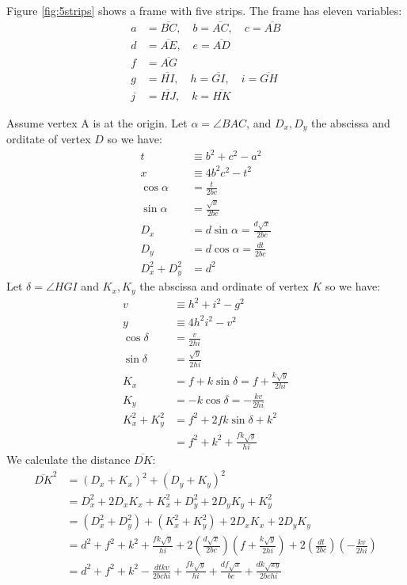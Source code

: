 \documentclass[11pt]{article}
\begin{document}
Figure \ref{fig:5strips} shows a frame with five strips. The frame has eleven variables:
\begin{align}
a &= \overline{BC}, \quad b = \overline{AC}, \quad c = \overline{AB}\\
d &= \overline{AE}, \quad e = \overline{AD}\\
f &= \overline{AG}\\
g &= \overline{HI}, \quad h = \overline{GI}, \quad i = \overline{GH}\\
j &= \overline{HJ}, \quad k = \overline{HK}
\end{align}

Assume vertex A is at the origin.
Let $\alpha = \angle{BAC}$, and $D_x,D_y$ the abscissa and orditate of vertex $D$ so we have:
\begin{align}
t &\equiv b^2 + c^2 - a^2\\
x &\equiv 4b^2c^2 - t^2\\
\cos\alpha &= \frac{t}{2bc}\\
\sin\alpha &= \frac{\sqrt{x}}{2bc}\\
D_x &= d\sin\alpha = \frac{d\sqrt{x}}{2bc}\\
D_y &= d\cos\alpha = \frac{dt}{2bc}\\
D_x^2 + D_y^2 &= d^2
\end{align}
Let $\delta = \angle{HGI}$ and $K_x,K_y$ the abscissa and ordinate of
vertex $K$ so we have:
\begin{align}
v &\equiv h^2 + i^2 - g^2\\
y &\equiv 4h^2i^2 - v^2\\
\cos\delta &= \frac{v}{2hi}\\
\sin\delta &= \frac{\sqrt{y}}{2hi}\\
K_x &= f + k\sin\delta = f + \frac{k\sqrt{y}}{2hi}\\
K_y &= -k\cos\delta = -\frac{kv}{2hi}\\
K_x^2 + K_y^2 &= f^2 + 2fk\sin\delta + k^2\\
 &= f^2+k^2 + \frac{fk\sqrt{y}}{hi}
\end{align}
We calculate the distance $\overline{DK}$:
\begin{align}
\overline{DK}^2 &= (D_x+K_x)^2 + (D_y+K_y)^2 \nonumber\\
 &= D_x^2 + 2D_xK_x + K_x^2 + D_y^2 + 2D_yK_y + K_y^2 \nonumber\\
 &= (D_x^2+D_y^2) + (K_x^2+K_y^2) + 2D_xK_x + 2D_yK_y \nonumber\\
 &= d^2 + f^2 + k^2 + \frac{fk\sqrt{y}}{hi}
  + 2\left(\frac{d\sqrt{x}}{2bc}\right)\left(f + \frac{k\sqrt{y}}{2hi}\right)
  + 2\left(\frac{dt}{2bc}\right)\left(-\frac{kv}{2hi}\right) \nonumber\\
 &= d^2 + f^2 + k^2 - \frac{dtkv}{2bchi} + \frac{fk\sqrt{y}}{hi}
  + \frac{df\sqrt{x}}{bc} + \frac{dk\sqrt{xy}}{2bchi}
\end{align}
\end{document}
